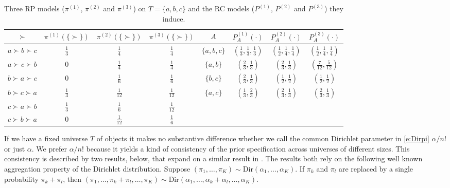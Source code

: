 \documentclass[11pt,letter]{article}
\begin{document}
\begin{table}
\renewcommand{\arraystretch}{1.3}
\begin{center}
\begin{tabular}{cccc|cccc}
$\succ$ & $\pi^{(1)}(\{\succ\})$ & $\pi^{(2)}(\{\succ\})$ & $\pi^{(3)}(\{\succ\})$ & $A$ & $P_A^{(1)}(\cdot)$ & $P_A^{(2)}(\cdot)$ & $P_A^{(3)}(\cdot)$ \\
\hline
$a \succ b \succ c$ &
$\tfrac{1}{3}$ & $\tfrac{1}{4}$ & $\tfrac{1}{4}$ &
$\{a,b,c\}$ & $(\tfrac{1}{3},\tfrac{1}{3},\tfrac{1}{3})$ &
$(\tfrac{1}{2},\tfrac{1}{4},\tfrac{1}{4})$ &
$(\tfrac{1}{2},\tfrac{1}{4},\tfrac{1}{4})$ \\
$a \succ c \succ b$ &
$0$ & $\tfrac{1}{4}$ & $\tfrac{1}{4}$ &
$\{a,b\}$ & $(\tfrac{2}{3},\tfrac{1}{3})$ & $(\tfrac{2}{3},\tfrac{1}{3})$ & $(\tfrac{7}{12},\tfrac{5}{12})$ \\

$b \succ a \succ c$ &
$0$ & $\tfrac{1}{6}$ & $\tfrac{1}{6}$ &
$\{b,c\}$ & $(\tfrac{2}{3},\tfrac{1}{3})$ & $(\tfrac{1}{2},\tfrac{1}{2})$ & $(\tfrac{1}{2},\tfrac{1}{2})$ \\
$b \succ c \succ a$ &
$\tfrac{1}{3}$ & $\tfrac{1}{12}$ & $\tfrac{1}{12}$ &
$\{a,c\}$ & $(\tfrac{1}{3},\tfrac{2}{3})$ & $(\tfrac{2}{3},\tfrac{1}{3})$ & $(\tfrac{2}{3},\tfrac{1}{3})$ \\

$c \succ a \succ b$ &
$\tfrac{1}{3}$ & $\tfrac{1}{6}$ & $\tfrac{1}{12}$ \\
$c \succ b \succ a$ &
$0$ & $\tfrac{1}{12}$ & $\tfrac{1}{6}$ \\
\hline
\end{tabular}
\caption{Three RP models ($\pi^{(1)}$, $\pi^{(2)}$ and $\pi^{(3)}$) on $T = \{a,b,c\}$ and the RC models ($P^{(1)}$, $P^{(2)}$ and $P^{(3)}$) they induce.}
\label{t:threeRPRC}
\end{center}
\end{table}

If we have a fixed universe $T$ of objects it makes no substantive difference whether we call the common Dirichlet parameter in \eqref{e:Dirpi} $\alpha/n!$ or just $\alpha$.
We prefer $\alpha/n!$ because it yields a kind of consistency of the prior specification across universes of different sizes.
This consistency is described by two results, below, that expand on a similar result in .
The results both rely on the following well known aggregation property of the Dirichlet distribution.
Suppose $(\pi_1,\ldots,\pi_K) \sim \mathrm{Dir}(\alpha_1,\ldots,\alpha_K)$.
If $\pi_k$ and $\pi_l$ are replaced by a single probability $\pi_k + \pi_l$, then $(\pi_1,\ldots,\pi_k+\pi_l,\ldots,\pi_K) \sim \mathrm{Dir}(\alpha_1,\ldots,\alpha_k + \alpha_l,\ldots,\alpha_K)$.
\end{document}
